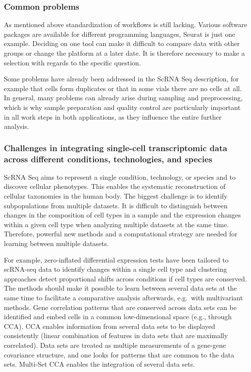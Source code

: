 \hypertarget{common-problems}{%
\subsubsection{Common problems}\label{common-problems}}

As mentioned above standardization of workflows is still lacking.
Various software packages are available for different programming
languages, Seurat is just one example. Deciding on one tool can make it
difficult to compare data with other groups or change the platform at a
later date. It is therefore necessary to make a selection with regards
to the specific question.

Some problems have already been addressed in the ScRNA Seq description,
for example that cells form duplicates or that in some vials there are
no cells at all. In general, many problems can already arise during
sampling and preprocessing, which is why sample preparation and quality
control are particularly important in all work steps in both
applications, as they influence the entire further analysis.

\hypertarget{challenges-in-integrating-single-cell-transcriptomic-data-across-different-conditions-technologies-and-species}{%
\subsubsection{Challenges in integrating single-cell transcriptomic data
across different conditions, technologies, and
species}\label{challenges-in-integrating-single-cell-transcriptomic-data-across-different-conditions-technologies-and-species}}

ScRNA Seq aims to represent a single condition, technology, or species
and to discover cellular phenotypes. This enables the systematic
reconstruction of cellular taxonomies in the human body. The biggest
challenge is to identify subpopulations from multiple datasets. It is
difficult to distinguish between changes in the composition of cell
types in a sample and the expression changes within a given cell type
when analyzing multiple datasets at the same time. Therefore, powerful
new methods and a computational strategy are needed for learning between
multiple datasets.

For example, zero-inflated differential expression tests have been
tailored to scRNA-seq data to identify changes within a single cell type
and clustering approaches detect proportional shifts across conditions
if cell types are conserved. The methods should make it possible to
learn between several data sets at the same time to facilitate a
comparative analysis afterwards, e.g.~with multivariant methods. Gene
correlation patterns that are conserved across data sets can be
identified and embed cells in a common low-dimensional space (e.g.,
through CCA). CCA enables information from several data sets to be
displayed consistently (linear combination of features in data sets that
are maximally correlated). Data sets are treated as multiple
measurements of a gene-gene covariance structure, and one looks for
patterns that are common to the data sets. Multi-Set CCA enables the
integration of several data sets.

